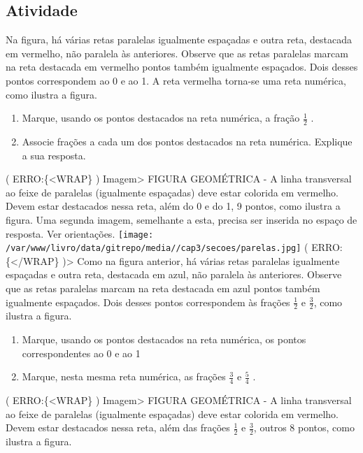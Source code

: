 \documentclass[a4,12pt]{book}
\begin{document}
\subsection{Atividade}

Na figura, há várias retas paralelas igualmente espaçadas e outra reta, destacada em vermelho, não paralela às anteriores. Observe que as retas paralelas marcam na reta destacada em vermelho pontos também igualmente espaçados. Dois desses pontos correspondem ao 0 e ao 1. A reta vermelha torna-se uma reta numérica, como ilustra a figura. 

\begin{enumerate} [\quad a)] %
  \item     Marque, usando os pontos destacados na reta numérica, a fração     $\frac{1}{2}$    . 
  \item     Associe frações a cada um dos pontos destacados na reta numérica. Explique a sua resposta.    \mbox{} \newline      
\end{enumerate} %
( ERRO:\{<WRAP\} ) Imagem> FIGURA GEOMÉTRICA -  A linha transversal ao feixe de paralelas (igualmente espaçadas) deve estar colorida em vermelho. Devem estar destacados nessa reta, além do 0 e do 1, 9 pontos, como ilustra a figura. Uma segunda imagem, semelhante a esta, precisa ser inserida no espaço de resposta. Ver orientações. \mbox{} \newline  \texttt{[image: /var/www/livro/data/gitrepo/media//cap3/secoes/parelas.jpg]} ( ERRO:\{</WRAP\} )>\mbox{} \newline  \mbox{} \newline  Como na figura anterior, há várias retas paralelas igualmente espaçadas e outra reta, destacada em azul, não paralela às anteriores. Observe que as retas paralelas marcam na reta destacada em azul pontos também igualmente espaçados. Dois desses pontos correspondem às frações $\frac{1}{2}$ e $\frac{3}{2}$, como ilustra a figura. 
\begin{enumerate} [\quad a)] %
  \item     Marque, usando os pontos destacados na reta numérica, os pontos correspondentes ao 0 e ao 1
  \item     Marque, nesta mesma reta numérica, as frações     $\frac{3}{4}$     e     $\frac{5}{4}$    .
\end{enumerate} %


( ERRO:\{<WRAP\} ) Imagem> FIGURA GEOMÉTRICA -  A linha transversal ao feixe de paralelas (igualmente espaçadas) deve estar colorida em vermelho. Devem estar destacados nessa reta, além das frações $\frac{1}{2}$ e $\frac{3}{2}$, outros 8 pontos, como ilustra a figura.
\end{document}
